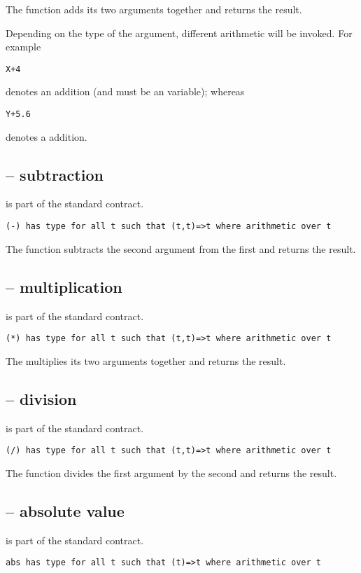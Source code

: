 The \q{+} function adds its two arguments together and returns the result.

Depending on the type of the argument, different arithmetic will be invoked. For example
\begin{lstlisting}
X+4
\end{lstlisting}
denotes an  addition (and  must be an  variable); whereas
\begin{lstlisting}
Y+5.6
\end{lstlisting}
denotes a  addition.

\subsection{\q{-} -- subtraction}
\label{minusFunction}
\q{-} is part of the standard  contract.
\begin{lstlisting}
(-) has type for all t such that (t,t)=>t where arithmetic over t
\end{lstlisting}

The \q{-} function subtracts the second argument from the first and returns the result.

\subsection{\q{*} -- multiplication}
\label{timesFunction}
\q{*} is part of the standard  contract.
\begin{lstlisting}
(*) has type for all t such that (t,t)=>t where arithmetic over t
\end{lstlisting}
The \q{*} multiplies its two arguments together and returns the result.

\subsection{\q{/} -- division}
\label{divideFunction}
\q{/} is part of the standard  contract.
\begin{lstlisting}
(/) has type for all t such that (t,t)=>t where arithmetic over t
\end{lstlisting}
The \q{/} function divides the first argument by the second and returns the result.


\subsection{ -- absolute value}
\label{abdFunction}
 is part of the standard  contract.
\begin{lstlisting}
abs has type for all t such that (t)=>t where arithmetic over t
\end{lstlisting}

